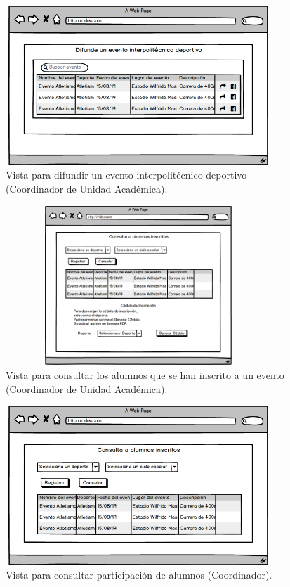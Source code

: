 		\begin{figure} [hbt!]
			\centering
			\includegraphics[width=10cm, height=6cm]{Imagenes/Nuevos/P14_Difundir_evento}
			\caption{Vista para difundir un evento interpolitécnico deportivo (Coordinador de Unidad Académica).}
			\label{difundirevento}
		\end{figure}
		\pagebreak

		\begin{figure} [hbt!]
			\centering
			\includegraphics[width=10cm, height=6cm]{Imagenes/Nuevos/P15_Consulta_alumnos_inscritos}
			\caption{Vista para consultar los alumnos que se han inscrito a un evento (Coordinador de Unidad Académica).}
			\label{consultaalumnosinscritos}
		\end{figure}
	
		\begin{figure} [hbt!]
			\centering
			\includegraphics[width=10cm, height=6cm]{Imagenes/Nuevos/P16_Consulta_para_expedir_constancias}
			\caption{Vista para consultar participación de alumnos (Coordinador).}
			\label{consultaparaexpedirconstancias}
		\end{figure}
		
